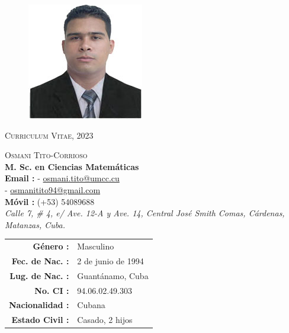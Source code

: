 




\thispagestyle{plain}

\vspace*{-2cm}
\begin{figure}[h]
	\centering
		\includegraphics{OTitoC2x2.jpg}%
\end{figure}

\begin{center}
\textsc{\huge Curriculum Vitae, 2023}
\end{center}
\vspace*{0.3cm}

\begin{multicols}{2}
\begin{flushleft}
\textsc{\Large Osmani Tito-Corrioso}\\
\textbf{\large M. Sc. en Ciencias Matem\'aticas}\\
\textbf{Email :} - \href{mailto:osmani.tito@umcc.cu}{osmani.tito@umcc.cu}\\
\hspace*{1.50cm} - \href{mailto:osmanitito94@gmail.com}{osmanitito94@gmail.com}\\
\textbf{M\'ovil :} (+53) 54089688\\
\textit{\small Calle 7, \# 4, e/ Ave. 12-A y Ave. 14, Central Jos\'e Smith Comas, C\'ardenas, Matanzas, Cuba.}\\
\end{flushleft}

\begin{flushright}
\begin{tabular}{rl}
\textbf{G\'enero :} & Masculino\\
\textbf{Fec. de Nac. :} & 2 de junio de 1994\\
\textbf{Lug. de Nac. :} & Guant\'anamo, Cuba\\
\textbf{No. CI :} & 94.06.02.49.303\\
\textbf{Nacionalidad :} & Cubana\\
\textbf{Estado Civil :} & Casado, 2 hijos
\end{tabular}
\end{flushright}
\end{multicols}

